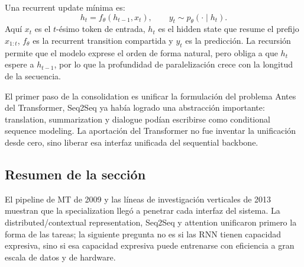 Una recurrent update mínima es:
\[
h_t=f_\theta(h_{t-1},x_t),\qquad y_t\sim p_\theta(\cdot\mid h_t).
\]
Aquí $x_t$ es el $t$-ésimo token de entrada, $h_t$ es el hidden state que resume el prefijo $x_{1:t}$, $f_\theta$ es la recurrent transition compartida y $y_t$ es la predicción. La recursión permite que el modelo exprese el orden de forma natural, pero obliga a que $h_t$ espere a $h_{t-1}$, por lo que la profundidad de paralelización crece con la longitud de la secuencia.

\begin{importantbox}{El primer paso de la consolidation es unificar la formulación del problema}
Antes del Transformer, Seq2Seq ya había logrado una abstracción importante: translation, summarization y dialogue podían escribirse como conditional sequence modeling. La aportación del Transformer no fue inventar la unificación desde cero, sino liberar esa interfaz unificada del sequential backbone.
\end{importantbox}

\subsection{Resumen de la sección}

El pipeline de MT de 2009 y las líneas de investigación verticales de 2013 muestran que la specialization llegó a penetrar cada interfaz del sistema. La distributed/contextual representation, Seq2Seq y attention unificaron primero la forma de las tareas; la siguiente pregunta no es si las RNN tienen capacidad expresiva, sino si esa capacidad expresiva puede entrenarse con eficiencia a gran escala de datos y de hardware.
